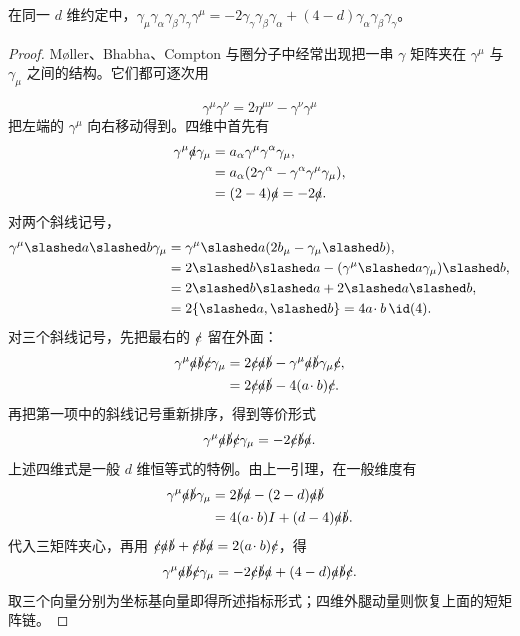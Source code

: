 \begin{lemma}
在同一 $d$ 维约定中，$\gamma_\mu\gamma_\alpha\gamma_\beta\gamma_\gamma\gamma^\mu=-2\gamma_\gamma\gamma_\beta\gamma_\alpha+(4-d)\gamma_\alpha\gamma_\beta\gamma_\gamma$。
\end{lemma}

\begin{proof}
M\o ller、Bhabha、Compton 与圈分子中经常出现把一串 $\gamma$ 矩阵夹在 $\gamma^\mu$ 与 $\gamma_\mu$ 之间的结构。它们都可逐次用

\begin{equation*}
 \gamma^\mu\gamma^\nu=2\eta^{\mu\nu}-\gamma^\nu\gamma^\mu
 \end{equation*}
把左端的 $\gamma^\mu$ 向右移动得到。四维中首先有
\begin{align*}
 \gamma^\mu\slashed a\gamma_\mu
 &=a_\alpha\gamma^\mu\gamma^\alpha\gamma_\mu,\\
 &=a_\alpha(2\gamma^\alpha-\gamma^\alpha\gamma^\mu\gamma_\mu),\\
 &=(2-4)\slashed a=-2\slashed a.
 \end{align*}
对两个斜线记号，
\begin{align*}
 \gamma^\mu\slashed a\slashed b\gamma_\mu
 &=\gamma^\mu\slashed a(2b_\mu-\gamma_\mu\slashed b),\\
 &=2\slashed b\slashed a-
 (\gamma^\mu\slashed a\gamma_\mu)\slashed b,\\
 &=2\slashed b\slashed a+2\slashed a\slashed b,\\
 &=2\{\slashed a,\slashed b\}=4a\!\cdot b\,\id(4).
 \end{align*}
对三个斜线记号，先把最右的 $\slashed c$ 留在外面：
\begin{align*}
 \gamma^\mu\slashed a\slashed b\slashed c\gamma_\mu
 &=2\slashed c\slashed a\slashed b
 -\gamma^\mu\slashed a\slashed b\gamma_\mu\slashed c,\\
 &=2\slashed c\slashed a\slashed b-4(a\!\cdot b)\slashed c.
\end{align*}
再把第一项中的斜线记号重新排序，得到等价形式
\begin{equation*}
 {
 \gamma^\mu\slashed a\slashed b\slashed c\gamma_\mu
 =-2\slashed c\slashed b\slashed a.}
 \end{equation*}
上述四维式是一般 $d$ 维恒等式的特例。由上一引理，在一般维度有
\begin{align*}
\gamma^\mu\slashed a\slashed b\gamma_\mu
&=2\slashed b\slashed a-(2-d)\slashed a\slashed b\\
&=4(a\!\cdot b)I+(d-4)\slashed a\slashed b.
\end{align*}
代入三矩阵夹心，再用
$\slashed c\slashed a\slashed b+\slashed c\slashed b\slashed a=2(a\!\cdot b)\slashed c$，得
\[
\gamma^\mu\slashed a\slashed b\slashed c\gamma_\mu
=-2\slashed c\slashed b\slashed a+(4-d)\slashed a\slashed b\slashed c.
\]
取三个向量分别为坐标基向量即得所述指标形式；四维外腿动量则恢复上面的短矩阵链。
\end{proof}

